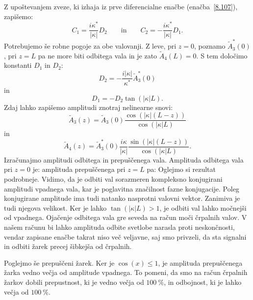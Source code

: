 Z upoštevanjem zveze, ki izhaja  iz prve diferencialne enačbe 
(enačba~\ref{8.107}), zapišemo:
\begin{equation}
C_1 = \frac{i \kappa^*}{|\kappa|}D_2 \qquad
\textrm{in} \qquad 
C_2 = -\frac{i \kappa^*}{|\kappa|}D_1. 
\end{equation}
Potrebujemo še robne pogoje za obe valovanji. Z leve, pri $z=0$,
poznamo $\tilde{A}_{3}^{*}\left(0\right)$, pri $z=L$ pa ne more biti odbitega
vala in je zato $\tilde{A}_{4}\left(L\right)=0$. S tem določimo konstanti $D_{1}$
in $D_{2}$:
\begin{equation}
D_2 = -\frac{i|\kappa|}{\kappa^*} \tilde{A}_3^*(0)
\end{equation}
in
\begin{equation}
D_1 = -D_2 \tan(|\kappa|L). 
\end{equation}
Zdaj lahko zapišemo amplitudi znotraj nelinearne snovi:
\begin{equation}
\tilde{A}_{3}\left(z\right)  =  \tilde{A}_3(0)
\frac{\cos\left(|\kappa|(L-z)\right)}{\cos\left(|\kappa|L\right)}
\end{equation}
in
\begin{equation}
\tilde{A}_{4}\left(z\right) =  \tilde{A}_3^*(0)\frac{i \kappa}{|\kappa|}
\frac{\sin\left(|\kappa|(L-z)\right)}{\cos\left(|\kappa|L\right)}.
\label{8.109}
\end{equation}
Izračunajmo amplitudi odbitega in prepuščenega vala. Amplituda odbitega vala 
pri $z=0$ je:
amplituda prepuščenega pri $z = L$ pa:
Oglejmo si rezultat podrobneje. Vidimo, da je odbiti val sorazmeren 
kompleksno konjugirani amplitudi vpadnega vala, kar je poglavitna značilnost
fazne konjugacije. 
Poleg konjugirane amplitude ima tudi natanko nasprotni valovni vektor. 
Zanimiva je tudi njegova velikost. Ker 
je lahko $\tan\left(|\kappa|L\right)>1$, je odbiti val lahko močnejši od vpadnega.
Ojačenje odbitega vala gre seveda na račun moči črpalnih
valov. V našem računu bi lahko amplituda odbite svetlobe narasla proti neskončnosti, 
vendar zapisane enačbe takrat niso več veljavne, saj smo privzeli, 
da sta signalni in odbiti žarek precej šibkejša od črpalnih.

Poglejmo še prepuščeni žarek. Ker je $\cos(x)\leq1$, je amplituda prepuščenega
žarka vedno večja od amplitude vpadnega. To pomeni, da smo na račun črpalnih žarkov
dobili prepustnost, ki je vedno večja od $100~\%$, in odbojnost, ki je lahko 
večja od $100~\%$.

